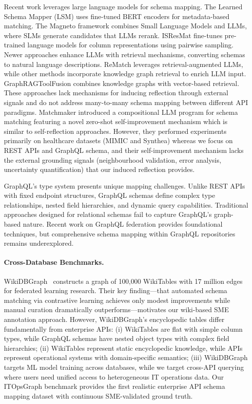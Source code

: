 \documentclass[sigconf, nonacm]{acmart}
\begin{document}
Recent work leverages large language models for schema mapping. The Learned Schema Mapper (LSM) \cite{zhang2023schema} uses fine-tuned BERT encoders for metadata-based matching. The Magneto framework \cite{liu2024magneto} combines Small Language Models and LLMs, where SLMs generate candidates that LLMs rerank. ISResMat \cite{du2024in} fine-tunes pre-trained language models for column representations using pairwise sampling. Newer approaches enhance LLMs with retrieval mechanisms, converting schemas to natural language descriptions. ReMatch \cite{sheetrit2024rematch} leverages retrieval-augmented LLMs, while other methods \cite{ma2025knowledge} incorporate knowledge graph retrieval to enrich LLM input. GraphRAGToolFusion \cite{lumer2025graphragtoolfusion} combines knowledge graphs with vector-based retrieval. These approaches lack mechanisms for inducing reflection through external signals and do not address many-to-many schema mapping between different API paradigms. Matchmaker \cite{matchmaker} introduced a compositional LLM program for schema matching featuring a novel zero-shot self-improvement mechanism which is similar to self-reflection approaches. However, they performed experiments primarily on healthcare datasets (MIMIC and Synthea) whereas we focus on REST APIs and GraphQL schema, and their self-improvement mechanism lacks the external grounding signals (neighbourhood validation, error analysis, uncertainty quantification) that our induced reflection provides.

GraphQL's type system presents unique mapping challenges. Unlike REST APIs with fixed endpoint structures, GraphQL schemas define complex type relationships, nested field hierarchies, and dynamic query capabilities. Traditional approaches designed for relational schemas fail to capture GraphQL's graph-based nature. Recent work on GraphQL federation provides foundational techniques, but comprehensive schema mapping within GraphQL repositories remains underexplored.

\paragraph{Cross-Database Benchmarks.} WikiDBGraph~\cite{wu2025wikidbgraph} constructs a graph of 100,000 WikiTables with 17 million edges for federated learning research. Their key finding—that automated schema matching via contrastive learning achieves only modest improvements while manual curation dramatically outperforms—motivates our wiki-based SME annotation approach. However, WikiDBGraph's encyclopedic tables differ fundamentally from enterprise APIs: (i) WikiTables are flat with simple column types, while GraphQL schemas have nested object types with complex field hierarchies; (ii) WikiTables represent static encyclopedic knowledge, while APIs represent operational systems with domain-specific semantics; (iii) WikiDBGraph targets ML model training across databases, while we target cross-API querying where users need unified access to heterogeneous IT operations data. Our ITOpsGraph benchmark provides the first realistic enterprise API schema mapping dataset with continuous SME-validated ground truth.
\end{document}
